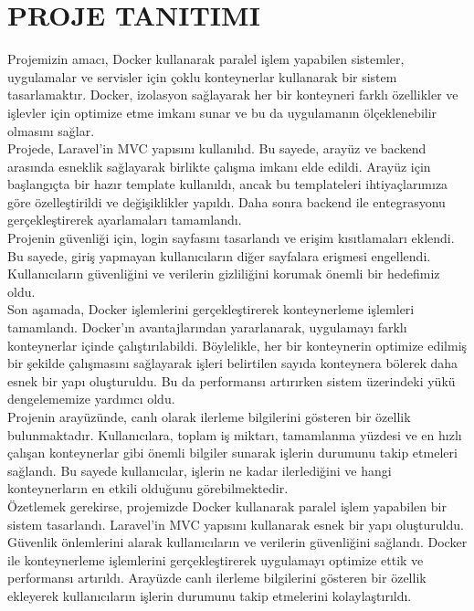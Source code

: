 \section{PROJE TANITIMI }
Projemizin amacı, Docker kullanarak paralel işlem yapabilen sistemler, uygulamalar ve servisler için çoklu konteynerlar kullanarak bir sistem tasarlamaktır. Docker, izolasyon sağlayarak her bir konteyneri farklı özellikler ve işlevler için optimize etme imkanı sunar ve bu da uygulamanın ölçeklenebilir olmasını sağlar.\\
Projede, Laravel'in MVC yapısını kullanılıd. Bu sayede, arayüz ve backend arasında esneklik sağlayarak birlikte çalışma imkanı elde edildi. Arayüz için başlangıçta bir hazır template kullanıldı, ancak bu templateleri ihtiyaçlarımıza göre özelleştirildi ve değişiklikler yapıldı. Daha sonra backend ile entegrasyonu gerçekleştirerek ayarlamaları tamamlandı.\\
Projenin güvenliği için, login sayfasını tasarlandı ve erişim kısıtlamaları eklendi. Bu sayede, giriş yapmayan kullanıcıların diğer sayfalara erişmesi engellendi. Kullanıcıların güvenliğini ve verilerin gizliliğini korumak önemli bir hedefimiz oldu.\\
Son aşamada, Docker işlemlerini gerçekleştirerek konteynerleme işlemleri tamamlandı. Docker'ın avantajlarından yararlanarak, uygulamayı farklı konteynerlar içinde çalıştırılabildi. Böylelikle, her bir konteynerin optimize edilmiş bir şekilde çalışmasını sağlayarak işleri belirtilen sayıda konteynera bölerek daha esnek bir yapı oluşturuldu. Bu da performansı artırırken sistem üzerindeki yükü dengelememize yardımcı oldu.\\
Projenin arayüzünde, canlı olarak ilerleme bilgilerini gösteren bir özellik bulunmaktadır. Kullanıcılara, toplam iş miktarı, tamamlanma yüzdesi ve en hızlı çalışan konteynerlar gibi önemli bilgiler sunarak işlerin durumunu takip etmeleri sağlandı. Bu sayede kullanıcılar, işlerin ne kadar ilerlediğini ve hangi konteynerların en etkili olduğunu görebilmektedir.\\
Özetlemek gerekirse, projemizde Docker kullanarak paralel işlem yapabilen bir sistem tasarlandı. Laravel'in MVC yapısını kullanarak esnek bir yapı oluşturuldu. Güvenlik önlemlerini alarak kullanıcıların ve verilerin güvenliğini sağlandı. Docker ile konteynerleme işlemlerini gerçekleştirerek uygulamayı optimize ettik ve performansı artırıldı. Arayüzde canlı ilerleme bilgilerini gösteren bir özellik ekleyerek kullanıcıların işlerin durumunu takip etmelerini kolaylaştırıldı.\\
